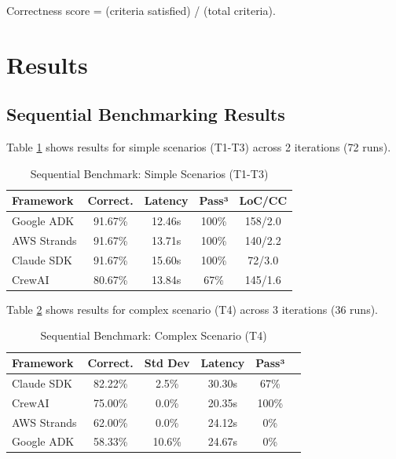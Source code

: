 \documentclass[sigconf,nonacm]{acmart}
\begin{document}
Correctness score = (criteria satisfied) / (total criteria).

\section{Results}

\subsection{Sequential Benchmarking Results}

Table \ref{tab:sequential-simple} shows results for simple scenarios (T1-T3) across 2 iterations (72 runs).

\begin{table}[h]
\caption{Sequential Benchmark: Simple Scenarios (T1-T3)}
\label{tab:sequential-simple}
\begin{tabular}{lcccc}
\toprule
\textbf{Framework} & \textbf{Correct.} & \textbf{Latency} & \textbf{Pass³} & \textbf{LoC/CC} \\
\midrule
Google ADK & 91.67\% & 12.46s & 100\% & 158/2.0 \\
AWS Strands & 91.67\% & 13.71s & 100\% & 140/2.2 \\
Claude SDK & 91.67\% & 15.60s & 100\% & 72/3.0 \\
CrewAI & 80.67\% & 13.84s & 67\% & 145/1.6 \\
\bottomrule
\end{tabular}
\end{table}

Table \ref{tab:sequential-complex} shows results for complex scenario (T4) across 3 iterations (36 runs).

\begin{table}[h]
\caption{Sequential Benchmark: Complex Scenario (T4)}
\label{tab:sequential-complex}
\begin{tabular}{lccccc}
\toprule
\textbf{Framework} & \textbf{Correct.} & \textbf{Std Dev} & \textbf{Latency} & \textbf{Pass³} \\
\midrule
Claude SDK & 82.22\% & 2.5\% & 30.30s & 67\% \\
CrewAI & 75.00\% & 0.0\% & 20.35s & 100\% \\
AWS Strands & 62.00\% & 0.0\% & 24.12s & 0\% \\
Google ADK & 58.33\% & 10.6\% & 24.67s & 0\% \\
\bottomrule
\end{tabular}
\end{table}
\end{document}

